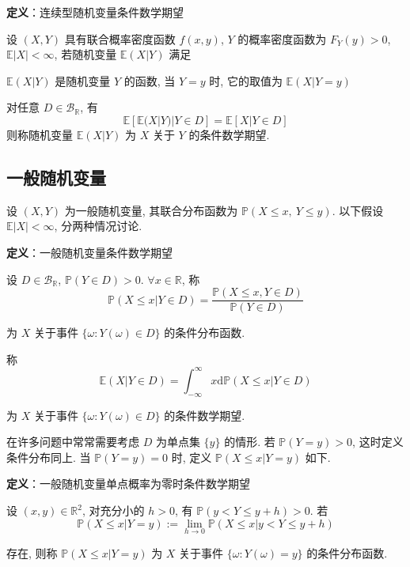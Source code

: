 \documentclass[openany]{ctexbook}
\theoremstyle{kaiti}
\theoremstyle{normal}
\begin{document}
\textbf{定义}：连续型随机变量条件数学期望

设 $(X,Y)$ 具有联合概率密度函数 $f(x,y)$, $Y$ 的概率密度函数为 $F_Y(y)>0$, $\mathbb{E}|X|<\infty$, 若随机变量 $\mathbb{E}(X|Y)$ 满足

$\mathbb{E}(X|Y)$ 是随机变量 $Y$ 的函数, 当 $Y=y$ 时, 它的取值为 $\mathbb{E}(X|Y=y)$

对任意 $D\in\mathcal{B}_{\mathbb{R}}$, 有
\begin{equation}
  \mathbb{E}[\mathbb{E}(X|Y)|Y\in D]=\mathbb{E}[X|Y\in D]
\end{equation}
则称随机变量 $\mathbb{E}(X|Y)$ 为 $X$ 关于 $Y$ 的条件数学期望.

\subsection{一般随机变量}

设 $(X,Y)$ 为一般随机变量, 其联合分布函数为 $\mathbb{P}(X\leqslant x,~Y\leqslant y)$. 以下假设 $\mathbb{E}|X|<\infty$, 分两种情况讨论.

\textbf{定义}：一般随机变量条件数学期望

设 $D\in\mathcal{B}_{\mathbb{R}}$, $\mathbb{P}(Y\in D)>0$. $\forall x\in\mathbb{R}$, 称 
\begin{equation}
  \mathbb{P}(X\leqslant x|Y\in D)=\frac{\mathbb{P}(X\leqslant x,Y\in D)}{\mathbb{P}(Y\in D)}
\end{equation} 

为 $X$ 关于事件 $\{\omega:Y(\omega)\in D\}$ 的条件分布函数. 

称
\begin{equation}
  \mathbb{E}(X|Y\in D)=\int_{-\infty}^\infty x\mathrm{d}\mathbb{P}(X\leqslant x|Y\in D)
\end{equation}

为 $X$ 关于事件 $\{\omega:Y(\omega)\in D\}$ 的条件数学期望.

在许多问题中常常需要考虑 $D$ 为单点集 $\{y\}$ 的情形. 若 $\mathbb{P}(Y=y)>0$, 这时定义条件分布同上. 当 $\mathbb{P}(Y=y)=0$ 时, 定义 $\mathbb{P}(X\leqslant x|Y=y)$ 如下.

\textbf{定义}：一般随机变量单点概率为零时条件数学期望

设 $(x,y)\in\mathbb{R}^2$, 对充分小的 $h>0$, 有 $\mathbb{P}(y<Y\leqslant y+h)>0$. 若
\begin{equation}
  \mathbb{P}(X\leqslant x|Y=y):=\lim_{h\to0}\mathbb{P}(X\leqslant x|y<Y\leqslant y+h)
\end{equation}

存在, 则称 $\mathbb{P}(X\leqslant x|Y=y)$ 为 $X$ 关于事件 $\{\omega:Y(\omega)=y\}$ 的条件分布函数. 
\end{document}
